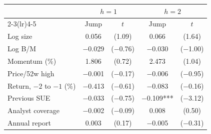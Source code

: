 \begin{tabular}{lcccc}
\toprule
 & \multicolumn{2}{c}{$h=1$} & \multicolumn{2}{c}{$h=2$}\\
\cmidrule(lr){2-3}\cmidrule(lr){4-5}
 & Jump & $t$ & Jump & $t$\\
\midrule
Log size & 0.056 & (1.09) & 0.066 & (1.64)\\
Log B/M & \ensuremath{-}0.029 & (\ensuremath{-}0.76) & \ensuremath{-}0.030 & (\ensuremath{-}1.00)\\
Momentum (\%) & 1.806 & (0.72) & 2.473 & (1.04)\\
Price/52w high & \ensuremath{-}0.001 & (\ensuremath{-}0.17) & \ensuremath{-}0.006 & (\ensuremath{-}0.95)\\
Return, $-2$ to $-1$ (\%) & \ensuremath{-}0.413 & (\ensuremath{-}0.61) & \ensuremath{-}0.083 & (\ensuremath{-}0.16)\\
Previous SUE & \ensuremath{-}0.033 & (\ensuremath{-}0.75) & \ensuremath{-}0.109*** & (\ensuremath{-}3.12)\\
Analyst coverage & \ensuremath{-}0.002 & (\ensuremath{-}0.09) & 0.008 & (0.50)\\
Annual report & 0.003 & (0.17) & \ensuremath{-}0.005 & (\ensuremath{-}0.31)\\
\bottomrule
\end{tabular}
